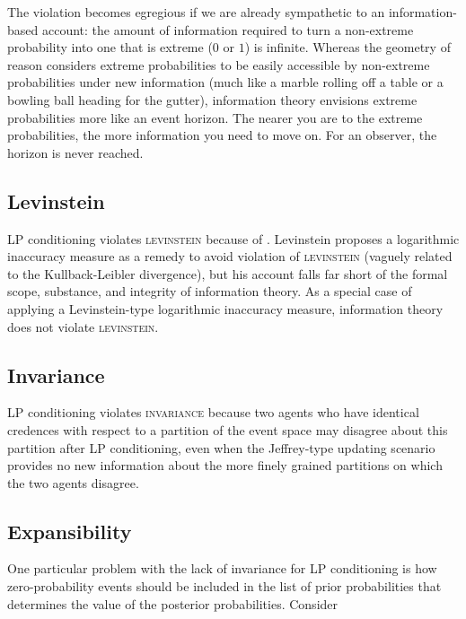 \documentclass[11pt]{article}
\begin{document}
The violation becomes egregious if we are already sympathetic to an
infor\-ma\-tion-based account: the amount of information required to
turn a non-extreme probability into one that is extreme ($0$ or $1$)
is infinite. Whereas the geometry of reason considers extreme
probabilities to be easily accessible by non-extreme probabilities
under new information (much like a marble rolling off a table or a
bowling ball heading for the gutter), information theory envisions
extreme probabilities more like an event horizon. The nearer you are
to the extreme probabilities, the more information you need to move
on. For an observer, the horizon is never reached.

\subsection{Levinstein}
\label{Levinstein}

LP conditioning violates \textsc{levinstein} because of 
. Levinstein proposes a logarithmic
inaccuracy measure as a remedy to avoid violation of
\textsc{levinstein} (vaguely related to the Kullback-Leibler
divergence), but his account falls far short of the formal scope,
substance, and integrity of information theory. As a special case of
applying a Levinstein-type logarithmic inaccuracy measure, information
theory does not violate \textsc{levinstein}.

\subsection{Invariance}
\label{Invariance}

LP conditioning violates \textsc{invariance} because two agents who
have identical credences with respect to a partition of the event
space may disagree about this partition after LP conditioning, even
when the Jeffrey-type updating scenario provides no new information
about the more finely grained partitions on which the two agents
disagree.

\subsection{Expansibility}
\label{Expansibility}

One particular problem with the lack of invariance for LP conditioning
is how zero-probability events should be included in the list of prior
probabilities that determines the value of the posterior
probabilities. Consider
\end{document}
